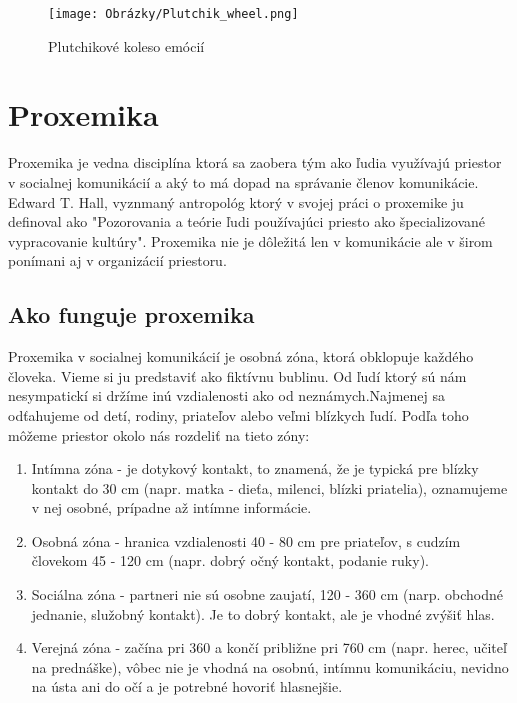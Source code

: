 \documentclass[10pt,twoside,slovak,a4paper]{article}
\begin{document}

\begin{figure}[H]
		\centering
		\texttt{[image: Obrázky/Plutchik\_wheel.png]}
		\caption{Plutchikové koleso emócií}
		\label{fig:EWheel}
\end{figure}

\pagebreak

\section{Proxemika}\label{proxemika}

Proxemika je vedna disciplína ktorá sa zaobera tým ako ľudia využívajú priestor v
socialnej komunikácií a aký to má dopad na správanie členov komunikácie. Edward T. Hall,
vyznmaný antropológ ktorý v svojej práci o proxemike ju definoval ako "Pozorovania a teórie %
ľudi používajúci priesto ako špecializované vypracovanie kultúry". Proxemika nie je dôležitá
len v komunikácie ale v širom ponímani aj v organizácií priestoru.

\subsection{Ako funguje proxemika}\label{proxemika:funkcnost}

Proxemika v socialnej komunikácií je osobná zóna, ktorá obklopuje každého človeka. Vieme si ju
predstaviť ako fiktívnu bublinu. Od ľudí ktorý sú nám nesympatickí si držíme inú vzdialenosti ako
od neznámych.Najmenej sa odťahujeme od detí, rodiny, priateľov alebo veľmi blízkych ľudí. Podľa
toho môžeme priestor okolo nás rozdeliť na tieto zóny:

\begin{enumerate}
	\item Intímna zóna - je dotykový kontakt, to znamená, že je typická pre blízky kontakt do 30 cm (napr. matka - dieťa, milenci, blízki priatelia), oznamujeme v nej osobné, prípadne až intímne informácie.
	\item Osobná zóna - hranica vzdialenosti 40 - 80 cm pre priateľov, s cudzím človekom 45 - 120 cm (napr. dobrý očný kontakt,  podanie ruky).
	\item Sociálna zóna - partneri nie sú osobne zaujatí, 120 - 360 cm (narp. obchodné jednanie, služobný kontakt). Je to dobrý kontakt, ale je vhodné zvýšiť hlas.
	\item Verejná zóna - začína pri 360 a končí približne pri 760 cm (napr. herec, učiteľ na prednáške), vôbec nie je vhodná na osobnú, intímnu komunikáciu, nevidno na ústa ani do očí a je potrebné hovoriť hlasnejšie.
\end{enumerate}
\end{document}
